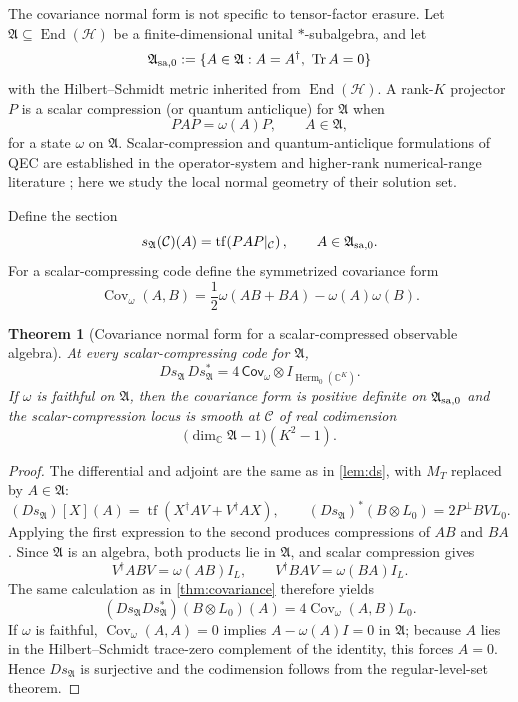 \documentclass[11pt]{article}
\newtheorem{theorem}{Theorem}[section]
\theoremstyle{definition}
\newcommand{\cH}{\mathcal H}
\newcommand{\cC}{\mathcal C}
\newcommand{\Herm}{\operatorname{Herm}}
\newcommand{\Tr}{\operatorname{Tr}}
\newcommand{\tf}{\operatorname{tf}}
\newcommand{\Cov}{\operatorname{Cov}}
\newcommand{\C}{\mathbb C}
\newcommand{\1}{\mathbf 1}
\begin{document}
The covariance normal form is not specific to tensor-factor erasure.  Let $\mathfrak A\subseteq\operatorname{End}(\cH)$ be a finite-dimensional unital $*$-subalgebra, and let
\[
\mathfrak A_{\rm sa,0}:=\{A\in\mathfrak A:A=A^\dagger,\ \Tr A=0\}
\]
with the Hilbert--Schmidt metric inherited from $\operatorname{End}(\cH)$.  A rank-$K$ projector $P$ is a scalar compression (or quantum anticlique) for $\mathfrak A$ when
\[
PAP=\omega(A)P,\qquad A\in\mathfrak A,
\]
for a state $\omega$ on $\mathfrak A$.  Scalar-compression and quantum-anticlique formulations of QEC are established in the operator-system and higher-rank numerical-range literature \cite{Weaver2018,LiPoon2008,KribsEtAl2005}; here we study the local normal geometry of their solution set.

Define the section
\[
s_{\mathfrak A}(\cC)(A)=\tf\!\left(PAP|_{\cC}\right),
\qquad A\in\mathfrak A_{\rm sa,0}.
\]
For a scalar-compressing code define the symmetrized covariance form
\[
\Cov_\omega(A,B)
=\frac12\omega(AB+BA)-\omega(A)\omega(B).
\]

\begin{theorem}[Covariance normal form for a scalar-compressed observable algebra]
\label{thm:algebra-covariance}
At every scalar-compressing code for $\mathfrak A$,
\begin{equation}
\boxed{
D s_{\mathfrak A}\,D s_{\mathfrak A}^{*}
=4\,\mathsf{Cov}_{\omega}\otimes I_{\Herm_0(\C^K)}.
}
\label{eq:algebra-covariance}
\end{equation}
If $\omega$ is faithful on $\mathfrak A$, then the covariance form is positive definite on $\mathfrak A_{\rm sa,0}$ and the scalar-compression locus is smooth at $\cC$ of real codimension
\begin{equation}
\bigl(\dim_{\C}\mathfrak A-1\bigr)(K^2-1).
\label{eq:algebra-codim}
\end{equation}
\end{theorem}

\begin{proof}
The differential and adjoint are the same as in \cref{lem:ds}, with $M_T$ replaced by $A\in\mathfrak A$:
\[
(Ds_{\mathfrak A})[X](A)
=\tf(X^\dagger AV+V^\dagger AX),
\qquad
(Ds_{\mathfrak A})^*(B\otimes L_0)
=2P^\perp BVL_0.
\]
Applying the first expression to the second produces compressions of $AB$ and $BA$.  Since $\mathfrak A$ is an algebra, both products lie in $\mathfrak A$, and scalar compression gives
\[
V^\dagger ABV=\omega(AB)I_L,
\qquad
V^\dagger BAV=\omega(BA)I_L.
\]
The same calculation as in \cref{thm:covariance} therefore yields
\[
(Ds_{\mathfrak A}Ds_{\mathfrak A}^*)(B\otimes L_0)(A)
=4\Cov_\omega(A,B)L_0.
\]
If $\omega$ is faithful, $\Cov_\omega(A,A)=0$ implies $A-\omega(A)I=0$ in $\mathfrak A$; because $A$ lies in the Hilbert--Schmidt trace-zero complement of the identity, this forces $A=0$.  Hence $Ds_{\mathfrak A}$ is surjective and the codimension follows from the regular-level-set theorem.
\end{proof}
\end{document}
